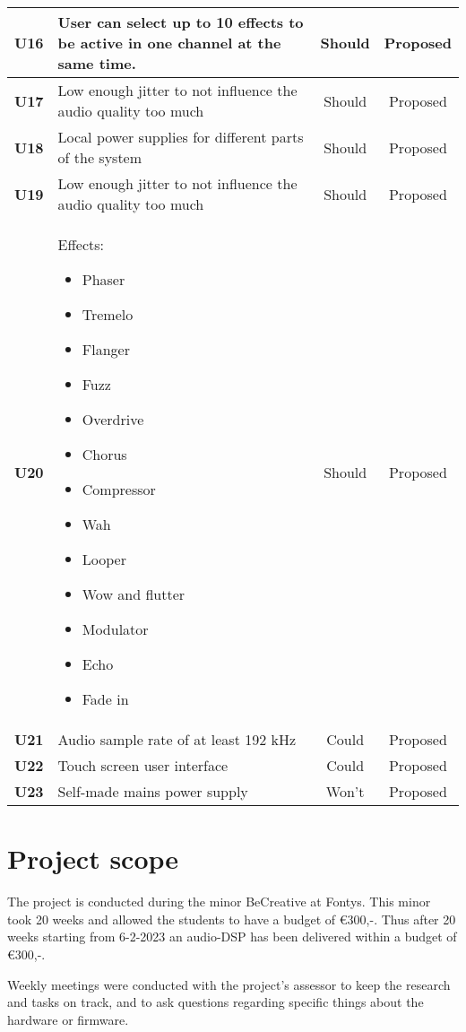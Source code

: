 \begin{longtable}{|c|p{10cm}|c|c|}
		\textbf{U16} & User can select up to 10 effects to be active in one channel at the same time. 								& Should & Proposed\\ \hline
		\textbf{U17} & Low enough jitter to not influence the audio quality too much 												& Should & Proposed\\ \hline
		\textbf{U18} & Local power supplies for different parts of the system 														& Should & Proposed\\ \hline
		\textbf{U19} & Low enough jitter to not influence the audio quality too much 												& Should & Proposed\\ \hline
		\textbf{U20} & Effects:\newline
		\begin{itemize}
			\setlength\itemsep{-0.3em}
			\item Phaser
			\item Tremelo
			\item Flanger
			\item Fuzz
			\item Overdrive
			\item Chorus
			\item Compressor
			\item Wah
			\item Looper
			\item Wow and flutter
			\item Modulator
			\item Echo
			\item Fade in
		\end{itemize}																												& Should & Proposed\\ \hline
		\textbf{U21} & Audio sample rate of at least 192 kHz 																		& Could  & Proposed\\ \hline
		\textbf{U22} & Touch screen user interface 																					& Could  & Proposed\\ \hline
		\textbf{U23} & Self-made mains power supply  																				& Won't  & Proposed\\ \hline
	\end{longtable}

\section{Project scope}

The project is conducted during the minor BeCreative at Fontys. This minor took 20 weeks and allowed the students to have a budget of €300,-. Thus after 20 weeks starting from 6-2-2023 an audio-DSP has been delivered within a budget of €300,-.
\par 
\noindent Weekly meetings were conducted with the project's assessor to keep the research and tasks on track, and to ask questions regarding specific things about the hardware or firmware. 

